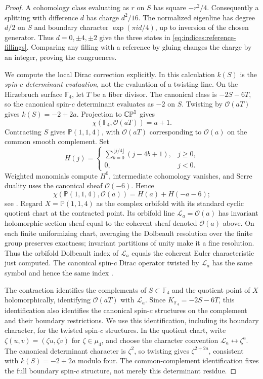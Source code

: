 \begin{proof}
A cohomology class evaluating as $r$ on $S$ has square $-r^2/4$.
Consequently a splitting with difference $d$ has charge $d^2/16$.
The normalized eigenline has degree $d/2$ on $S$ and boundary character
$\exp(\pi i d/4)$, up to inversion of the chosen generator.  Thus
$d=0,\pm4,\pm2$ give the three states in
\eqref{eq:indices:reference-fillings}.  Comparing any filling with a
reference by gluing changes the charge by an integer, proving the
congruences.

We compute the local Dirac correction explicitly.  In this calculation
$k(S)$ is the \emph{spin-$c$ determinant evaluation}, not the evaluation of
a twisting line.  On the Hirzebruch surface $\mathbb F_4$, let $T$ be a
fiber divisor.  The canonical class is $-2S-6T$, so the canonical spin-$c$
determinant evaluates as $-2$ on $S$.  Twisting by $\mathcal O(aT)$ gives
$k(S)=-2+2a$.  Projection to $\mathbb{CP}^1$ gives
\[
 \chi(\mathbb F_4,\mathcal O(aT))=a+1.
\]
Contracting $S$ gives $\mathbb P(1,1,4)$, with $\mathcal O(aT)$ corresponding
to $\mathcal O(a)$ on the common smooth complement.  Set
\[
 H(j)=
 \begin{cases}
 \displaystyle\sum_{b=0}^{\lfloor j/4\rfloor}(j-4b+1),&j\ge0,\\
 0,&j<0.
 \end{cases}
\]
Weighted monomials compute $H^0$, intermediate cohomology vanishes, and
Serre duality uses the canonical sheaf $\mathcal O(-6)$.  Hence
\[
 \chi(\mathbb P(1,1,4),\mathcal O(a))=H(a)+H(-a-6);
\]
see \cite[Sections~1.2.3 and~1.4.1]{Dolgachev1982}.
Regard $X=\mathbb P(1,1,4)$ as the complex orbifold with its standard
cyclic quotient chart at the contracted point.  Its orbifold line
$\mathcal L_a=\mathcal O(a)$ has invariant holomorphic-section sheaf
equal to the coherent sheaf denoted $\mathcal O(a)$ above.  On each
finite uniformizing chart, averaging the Dolbeault resolution over
the finite group preserves exactness; invariant partitions of unity
make it a fine resolution.  Thus the orbifold Dolbeault index of
$\mathcal L_a$ equals the coherent Euler characteristic just computed.
The canonical spin-$c$ Dirac operator twisted by $\mathcal L_a$ has
the same symbol and hence the same index
\cite[pp.~155--156]{Kawasaki1979}.

The contraction identifies the complements of $S\subset\mathbb F_4$
and the quotient point of $X$ holomorphically, identifying
$\mathcal O(aT)$ with $\mathcal L_a$.  Since
$K_{\mathbb F_4}=-2S-6T$, this identification also identifies the
canonical spin-$c$ structures on the complement and their boundary
restrictions.  We use this identification, including its boundary
character, for the twisted spin-$c$ structures.  In the quotient
chart, write $\zeta(u,v)=(\zeta u,\zeta v)$ for $\zeta\in\mu_4$,
and choose the character convention
$\mathcal L_a\leftrightarrow\zeta^a$.  The canonical determinant
character is $\zeta^2$, so twisting gives $\zeta^{2+2a}$, consistent
with $k(S)=-2+2a$ modulo four.  The common-complement identification
fixes the full boundary spin-$c$ structure, not merely this
determinant residue.


\end{proof}
